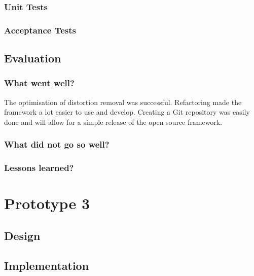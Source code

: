 \documentclass[11pt,oneside]{report}
\begin{document}
			
			\subsubsection{Unit Tests}
			\subsubsection{Acceptance Tests}
			
		\subsection{Evaluation}
			\subsubsection{What went well?}
			The optimisation of distortion removal was successful.
			Refactoring made the framework a lot easier to use and develop.
			Creating a Git repository was easily done and will allow for a simple release of the open source framework.
			\subsubsection{What did not go so well?}
			\subsubsection{Lessons learned?}
	\section{Prototype 3}\label{sec:p3}
		\subsection{Design}
		\subsection{Implementation}
\end{document}
